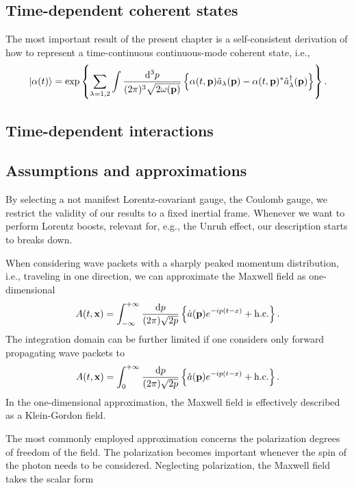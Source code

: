 
\subsection*{Time-dependent coherent states}

The most important result of the present chapter is a self-consistent derivation of how to represent a time-continuous continuous-mode coherent state, i.e.,
\begin{equation}
	\ket{\alpha(t)}
	=
	\exp\left\{
		\sum_{\lambda=1,2}
		\int\frac{\dd[3]{p}}{(2\pi)^3\sqrt{2\omega(\vb{p})}}
		\left\{
			\alpha(t,\vb{p})
			\hat{a}_\lambda(\vb{p})
			-
			\alpha(t,\vb{p})^*
			\hat{a}_\lambda^\dagger(\vb{p})
		\right\}
	\right\}
	.
\end{equation}

\subsection*{Time-dependent interactions}

\subsection*{Assumptions and approximations}

By selecting a not manifest Lorentz-covariant gauge, the Coulomb gauge, we restrict the validity of our results to a fixed inertial frame.
Whenever we want to perform Lorentz boosts, relevant for, e.g., the Unruh effect, our description starts to breaks down.

When considering wave packets with a sharply peaked momentum distribution, i.e., traveling in one direction, we can approximate the Maxwell field as one-dimensional
\begin{equation}
	A(t,\vb{x})
	=
	\int_{-\infty}^{+\infty}
	\frac{\dd{p}}{(2\pi)\sqrt{2p}}
	\left\{
		\hat{a}(\vb{p})
		e^{-ip(t-x)}
		+
		\text{h.c.}
	\right\}
	.
\end{equation}
The integration domain can be further limited if one considers only forward propagating wave packets to
\begin{equation}
	A(t,\vb{x})
	=
	\int_0^{+\infty}
	\frac{\dd{p}}{(2\pi)\sqrt{2p}}
	\left\{
		\hat{a}(\vb{p})
		e^{-ip(t-x)}
		+
		\text{h.c.}
	\right\}
	.
\end{equation}
In the one-dimensional approximation, the Maxwell field is effectively described as a Klein-Gordon field.

The most commonly employed approximation concerns the polarization degrees of freedom of the field.
The polarization becomes important whenever the spin of the photon needs to be considered.
Neglecting polarization, the Maxwell field takes the scalar form

